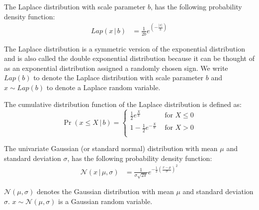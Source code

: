 \begin{definition}
    \label{def:LaplaceDistribution}
    The Laplace distribution with scale parameter $b$, has the following probability density function:
    \begin{equation}
        \begin{split}
            Lap\left(x \,|\,b\right)&= \frac{1}{2b}e^{\left( -\frac{\left| x\right| }{b}\right)}
        \end{split}
    \end{equation}
\end{definition}
The Laplace distribution is a symmetric version of the exponential distribution and is also called the double exponential distribution because it can be thought of as an exponential distribution assigned a randomly chosen sign.
We write $Lap\left(b\right)$ to denote the Laplace distribution with scale parameter $b$ and $x \sim Lap\left( b\right)$ to denote a Laplace random variable.

The cumulative distribution function of the Laplace distribution is defined as:
\begin{equation}
    \Pr\left( x\leq X\,|\,b\right)=
    \begin{cases}
        \frac{1}{2} e^{\frac{X}{b}}     & \text{ for } X \leq 0 \\
        1- \frac{1}{2} e^{-\frac{X}{b}} & \text{ for } X > 0    \\
    \end{cases}
\end{equation}


\begin{definition}
    \label{def:GaussianDistribution}
    The univariate Gaussian (or standard normal) distribution with mean $\mu$ and standard deviation $\sigma$, has the following probability density function:
    \begin{equation}
        \begin{split}
            \mathcal{N} \left( x \,|\, \mu,\sigma\right)&=\frac{1}{\sigma\sqrt{2 \pi}}e^{-\frac{1}{2}\left( \frac{x-\mu}{\sigma}\right) ^{2}}
        \end{split}
    \end{equation}
\end{definition}
$\mathcal{N} \left( \mu,\sigma\right)$ denotes the Gaussian distribution with mean $\mu$ and standard deviation $\sigma$.
$x \sim \mathcal{N}  \left(\mu,\sigma\right)$ is a Gaussian random variable.


